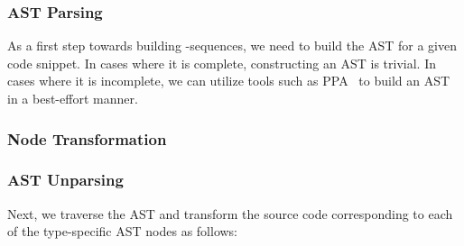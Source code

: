 \subsubsection{AST Parsing} As a first step towards building -sequences, we need to build the AST for a given code snippet. In cases where it is complete, constructing an AST is trivial. In cases where it is incomplete, we can utilize tools such as PPA~\cite{} to build an AST in a best-effort manner.

\subsubsection{Node Transformation}

\subsubsection{AST Unparsing}



Next, we traverse the AST and transform the source code corresponding to each of the type-specific AST nodes as follows:

%
